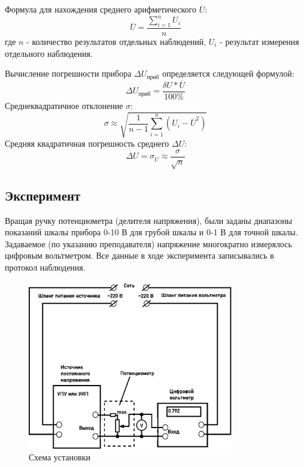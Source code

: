 Формула для нахождения среднего арифметического $\overline{U}$:
\begin{equation}
  \overline{U} = \frac{\sum_{i=1}^{n} U_i}{n}
\end{equation}
где $n$ - количество результатов отдельных наблюдений, $U_i$ - результат измерения отдельного наблюдения.

Вычисление погрешности прибора $\Delta U_{\text{приб}}$ определяется следующей формулой:
\begin{equation}
  \Delta U_{\text{приб}} = \frac{\delta U *\overline{U}}{100\%}
\end{equation}
Среднеквадратичное отклонение $\sigma$:
\begin{equation}
  \sigma \approx \sqrt{\frac{1}{n-1} \sum_{i = 1}^{n} (U_i -\overline{U}^2)}
\end{equation}
Средняя квадратичная погрешность среднего $\Delta U$:
\begin{equation}
  \Delta U = \sigma_{\overline{U}} \approx \frac{\sigma}{\sqrt{n}}
\end{equation}

\subsection{Эксперимент}
Вращая ручку потенциометра (делителя напряжения), были заданы диапазоны показаний шкалы прибора 0-10 В для грубой шкалы и 0-1 В для точной шкалы.
Задаваемое (по указанию преподавателя) напряжение многократно измерялось цифровым вольтметром. Все данные в ходе эксперимента записывались в протокол наблюдения.
\begin{figure}[ht!]
\centering
\includegraphics[width=0.8\textwidth]{схема.eps}
\caption{Схема установки}
\label{fig:sketch}
\end{figure}

